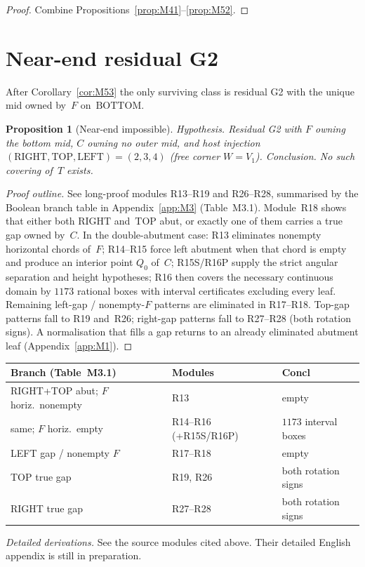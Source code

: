 \documentclass[11pt,reqno]{amsart}
\newtheorem{proposition}[theorem]{Proposition}
\theoremstyle{definition}
\newcommand{\BOTTOM}{\mathrm{BOTTOM}}
\newcommand{\RIGHT}{\mathrm{RIGHT}}
\newcommand{\TOP}{\mathrm{TOP}}
\newcommand{\LEFT}{\mathrm{LEFT}}
\begin{document}
\begin{proof}
Combine Propositions~\ref{prop:M41}--\ref{prop:M52}.
\end{proof}



\section{Near-end residual G2}\label{sec:near}

After Corollary~\ref{cor:M53} the only surviving class is residual G2 with the
unique mid owned by~$F$ on~$\BOTTOM$.

\begin{proposition}[Near-end impossible]\label{prop:M61}
\emph{Hypothesis.} Residual G2 with $F$ owning the bottom mid, $C$ owning no
outer mid, and host injection $(\RIGHT,\TOP,\LEFT)=(2,3,4)$ (free corner
$W=V_1$).
\emph{Conclusion.} No such covering of~$T$ exists.
\end{proposition}

\begin{proof}[Proof outline]
See long-proof modules R13--R19 and R26--R28, summarised by the Boolean
branch table in Appendix~\ref{app:M3} (Table~M3.1).  Module~R18 shows that
either both $\RIGHT$ and~$\TOP$ abut, or exactly one of them carries a true
gap owned by~$C$.  In the double-abutment case: R13 eliminates nonempty
horizontal chords of~$F$; R14--R15 force left abutment when that chord is
empty and produce an interior point $Q_0$ of~$C$; R15S/R16P supply the
strict angular separation and height hypotheses; R16 then covers the
necessary continuous domain by $1173$ rational boxes with interval
certificates excluding every leaf.  Remaining left-gap / nonempty-$F$
patterns are eliminated in R17--R18.  Top-gap patterns fall to R19 and~R26;
right-gap patterns fall to R27--R28 (both rotation signs).  A normalisation
that fills a gap returns to an already eliminated abutment leaf
(Appendix~\ref{app:M1}).
\end{proof}

\begin{center}
\small
\begin{tabular}{@{}p{}p{}p{}@{}}
\toprule
Branch (Table~M3.1) & Modules & Concl \\
\midrule
RIGHT+TOP abut; $F$ horiz.\ nonempty & R13 & empty \\
same; $F$ horiz.\ empty & R14--R16 (+R15S/R16P) & $1173$ interval boxes \\
LEFT gap / nonempty $F$ & R17--R18 & empty \\
TOP true gap & R19, R26 & both rotation signs \\
RIGHT true gap & R27--R28 & both rotation signs \\
\bottomrule
\end{tabular}
\end{center}
\smallskip
\noindent\emph{Detailed derivations.} See the source modules cited above. Their detailed English appendix is still in preparation.
\end{document}
